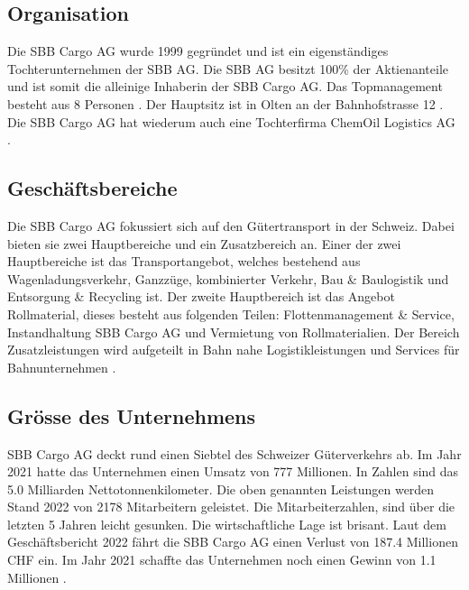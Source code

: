 \documentclass{article}
\begin{document}
\subsection{Organisation}

Die SBB Cargo AG wurde 1999 gegründet und ist ein eigenständiges Tochterunternehmen der SBB AG.
Die SBB AG besitzt 100\% der Aktienanteile und ist somit die alleinige Inhaberin der SBB Cargo AG.
Das Topmanagement besteht aus 8 Personen \parencite[o. S.]{managmentOrganigram}.
Der Hauptsitz ist in Olten an der Bahnhofstrasse 12 \parencite[o. S.]{standorte}.
Die SBB Cargo AG hat wiederum auch eine Tochterfirma ChemOil Logistics AG \parencite[o. S.]{chemOil}.

\subsection{Geschäftsbereiche}

Die SBB Cargo AG fokussiert sich auf den Gütertransport in der Schweiz.
Dabei bieten sie zwei Hauptbereiche und ein Zusatzbereich an.
Einer der zwei Hauptbereiche ist das Transportangebot, welches bestehend aus Wagenladungsverkehr, Ganzzüge, kombinierter Verkehr, Bau \& Baulogistik und Entsorgung \& Recycling ist.
Der zweite Hauptbereich ist das Angebot Rollmaterial, dieses besteht aus folgenden Teilen: Flottenmanagement \& Service, Instandhaltung SBB Cargo AG und Vermietung von Rollmaterialien. 
Der Bereich Zusatzleistungen wird aufgeteilt in Bahn nahe Logistikleistungen und Services für Bahnunternehmen \parencite[o. S.]{angebot}.

\subsection{Grösse des Unternehmens}

SBB Cargo AG deckt rund einen Siebtel des Schweizer Güterverkehrs ab.
Im Jahr 2021 hatte das Unternehmen einen Umsatz von 777 Millionen.
In Zahlen sind das 5.0 Milliarden Nettotonnenkilometer.
Die oben genannten Leistungen werden Stand 2022 von 2178 Mitarbeitern geleistet.
Die Mitarbeiterzahlen, sind über die letzten 5 Jahren leicht gesunken\parencite[o. S.]{personal}.
Die wirtschaftliche Lage ist brisant.
Laut dem Geschäftsbericht 2022 fährt die SBB Cargo AG einen Verlust von 187.4 Millionen CHF ein.
Im Jahr 2021 schaffte das Unternehmen noch einen Gewinn von 1.1 Millionen \parencite[S. 46]{geschaeftsbericht2022}.
\end{document}
